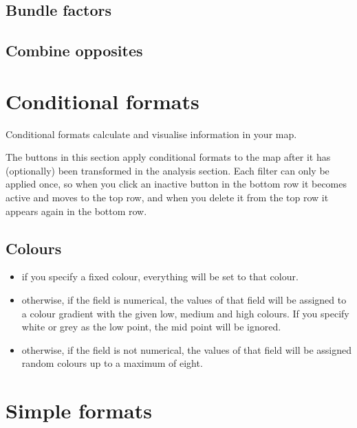 \documentclass[
]{book}
\providecommand{\tightlist}{%
  \setlength{\itemsep}{0pt}\setlength{\parskip}{0pt}}
\begin{document}
\hypertarget{bundle-factors}{%
\subsection{Bundle factors}\label{bundle-factors}}

\hypertarget{combine-opposites}{%
\subsection{Combine opposites}\label{combine-opposites}}

\hypertarget{conditional-formats}{%
\section{Conditional formats}\label{conditional-formats}}

Conditional formats calculate and visualise information in your map.

The buttons in this section apply conditional formats to the map after it has (optionally) been transformed in the analysis section. Each filter can only be applied once, so when you click an inactive button in the bottom row it becomes active and moves to the top row, and when you delete it from the top row it appears again in the bottom row.

\hypertarget{colours}{%
\subsection{\texorpdfstring{\textbf{Colours}}{Colours}}\label{colours}}

\begin{itemize}
\tightlist
\item
  if you specify a fixed colour, everything will be set to that colour.
\item
  otherwise, if the field is numerical, the values of that field will be assigned to a colour gradient with the given low, medium and high colours. If you specify white or grey as the low point, the mid point will be ignored.
\item
  otherwise, if the field is not numerical, the values of that field will be assigned random colours up to a maximum of eight.
\end{itemize}

\hypertarget{simple-formats}{%
\section{Simple formats}\label{simple-formats}}
\end{document}
